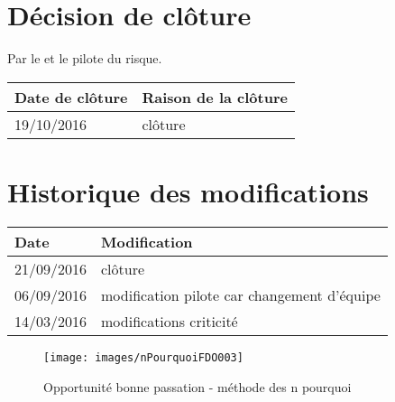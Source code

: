 \section*{Décision de clôture}
Par le \CP{} et le pilote du risque.
\begin{table}[h]
\centering
	\begin{tabularx}{16.8cm}{|X|X|}
	\hline
	\rowcolor{gray!40} Date de clôture & Raison de la clôture \\
	\hline
	 19/10/2016 & clôture \\
	\hline
	\end{tabularx}
\end{table}

\section*{Historique des modifications}
\begin{table}[h]
\centering
	\begin{tabularx}{16.8cm}{|X|X|}
	\hline
	\rowcolor{gray!40} Date & Modification \\%
	\hline
	 21/09/2016 & clôture \\ 
	\hline
	 06/09/2016 & modification pilote car changement d'équipe \\
	\hline
	 14/03/2016 & modifications criticité \\
	\hline
	\end{tabularx}
\end{table}
\newpage


\begin{figure}
	\centering
	\texttt{[image: images/nPourquoiFDO003]}
	\caption{\label{opportunite bonne passation}Opportunité bonne passation - méthode des n pourquoi}
\end{figure}
